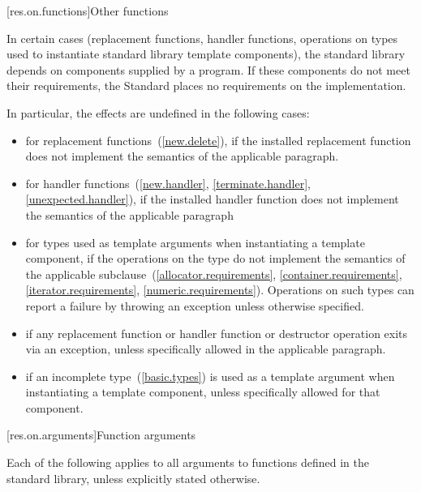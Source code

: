 [res.on.functions]{Other functions}

\pnum
In certain cases (replacement functions, handler functions, operations on types used to
instantiate standard library template components), the \Cpp standard library depends on
components supplied by a \Cpp program.
If these components do not meet their requirements, the Standard places no requirements
on the implementation.

\pnum
In particular, the effects are undefined in the following cases:

\begin{itemize}
\item
for replacement functions~(\ref{new.delete}), if the installed replacement function does not
implement the semantics of the applicable
\required
paragraph.
\item
for handler functions~(\ref{new.handler}, \ref{terminate.handler}, \ref{unexpected.handler}),
if the installed handler function does not implement the semantics of the applicable
\required
paragraph
\item
for types used as template arguments when instantiating a template component,
if the operations on the type do not implement the semantics of the applicable
subclause~(\ref{allocator.requirements}, \ref{container.requirements}, \ref{iterator.requirements},
\ref{numeric.requirements}).
Operations on such types can report a failure by throwing an exception
unless otherwise specified.
\item
if any replacement function or handler function or destructor operation exits via an exception,
unless specifically allowed
in the applicable
\required
paragraph.
\item
if an incomplete type~(\ref{basic.types}) is used as a template
argument when instantiating a template component, unless specifically
allowed for that component.
\end{itemize}

[res.on.arguments]{Function arguments}

\pnum
{}%
%
Each of the following applies to all arguments
%
to functions defined in the \Cpp standard library,%
unless explicitly stated otherwise.


